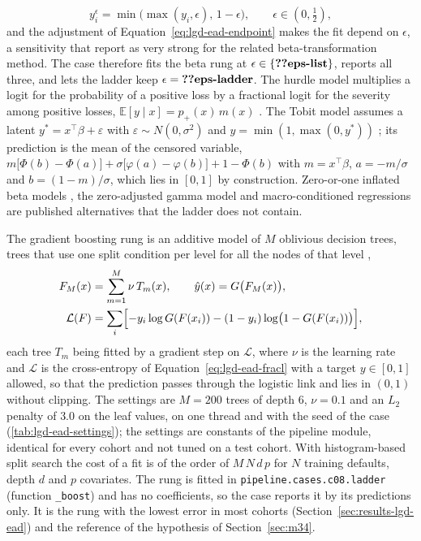 \begin{equation}
y^{\epsilon}_i=\min\bigl(\max(y_i,\epsilon),\,1-\epsilon\bigr),\qquad \epsilon\in(0,\tfrac12),
\label{eq:lgd-ead-endpoint}
\end{equation}
and the adjustment of Equation~\eqref{eq:lgd-ead-endpoint} makes the fit depend on $\epsilon$, a sensitivity that \citet{lgd-ead:qizhao2011} report as very strong for the related beta-transformation method. The case therefore fits the beta rung at $\epsilon\in\{\LE{eps-list}\}$, reports all three, and lets the ladder keep $\epsilon=\LE{eps-ladder}$. The hurdle model multiplies a logit for the probability of a positive loss by a fractional logit for the severity among positive losses, $\mathbb{E}[y\mid x]=p_{+}(x)\,m(x)$ \citep{lgd-ead:leow2012,lgd-ead:tong2013}. The Tobit model assumes a latent $y^{*}=x^{\top}\beta+\varepsilon$ with $\varepsilon\sim N(0,\sigma^{2})$ and $y=\min(1,\max(0,y^{*}))$ \citep{lgd-ead:tobin1958}; its prediction is the mean of the censored variable, $m\bigl[\Phi(b)-\Phi(a)\bigr]+\sigma\bigl[\varphi(a)-\varphi(b)\bigr]+1-\Phi(b)$ with $m=x^{\top}\beta$, $a=-m/\sigma$ and $b=(1-m)/\sigma$, which lies in $[0,1]$ by construction. Zero-or-one inflated beta models \citep{lgd-ead:ospina2012}, the zero-adjusted gamma model \citep{lgd-ead:tong2013} and macro-conditioned regressions \citep{lgd-ead:bellotticrook2012} are published alternatives that the ladder does not contain.

The gradient boosting rung is an additive model of $M$ oblivious decision trees, trees that use one split condition per level for all the nodes of that level \citep{lgd-ead:catboost2017},
\begin{equation}
\begin{split}
F_M(x)&=\sum_{m=1}^{M}\nu\,T_m(x),\qquad \hat y(x)=G\bigl(F_M(x)\bigr),\\
\mathcal L(F)&=\sum_i\Bigl[-y_i\log G(F(x_i))-(1-y_i)\log\bigl(1-G(F(x_i))\bigr)\Bigr],
\end{split}
\label{eq:lgd-ead-boost}
\end{equation}
each tree $T_m$ being fitted by a gradient step on $\mathcal L$, where $\nu$ is the learning rate and $\mathcal L$ is the cross-entropy of Equation~\eqref{eq:lgd-ead-fracl} with a target $y\in[0,1]$ allowed, so that the prediction passes through the logistic link and lies in $(0,1)$ without clipping. The settings are $M=200$ trees of depth $6$, $\nu=0.1$ and an $L_2$ penalty of $3.0$ on the leaf values, on one thread and with the seed of the case (\cref{tab:lgd-ead-settings}); the settings are constants of the pipeline module, identical for every cohort and not tuned on a test cohort. With histogram-based split search the cost of a fit is of the order of $M\,N\,d\,p$ for $N$ training defaults, depth $d$ and $p$ covariates. The rung is fitted in \texttt{pipeline.cases.c08.ladder} (function \texttt{\_boost}) and has no coefficients, so the case reports it by its predictions only. It is the rung with the lowest error in most cohorts (Section~\ref{sec:results-lgd-ead}) and the reference of the hypothesis of Section~\ref{sec:m34}.

